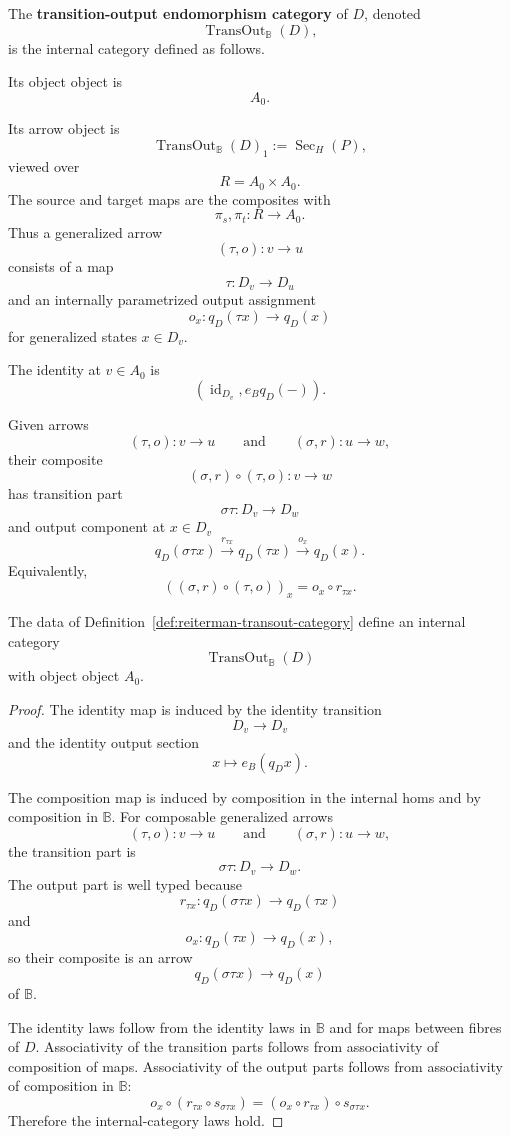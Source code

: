 \begin{definition}
\label{def:reiterman-transout-category}
The \textbf{transition-output endomorphism category} of \(D\), denoted
\[
\operatorname{TransOut}_{\mathbb B}(D),
\]
is the internal category defined as follows.

Its object object is
\[
A_0.
\]

Its arrow object is
\[
\operatorname{TransOut}_{\mathbb B}(D)_1
:=
\operatorname{Sec}_H(P),
\]
viewed over
\[
R=A_0\times A_0.
\]
The source and target maps are the composites with
\[
\pi_s,\pi_t:R\to A_0.
\]
Thus a generalized arrow
\[
(\tau,o):v\to u
\]
consists of a map
\[
\tau:D_v\to D_u
\]
and an internally parametrized output assignment
\[
o_x:q_D(\tau x)\to q_D(x)
\]
for generalized states \(x\in D_v\).

The identity at \(v\in A_0\) is
\[
(\operatorname{id}_{D_v}, e_Bq_D(-)).
\]

Given arrows
\[
(\tau,o):v\to u
\qquad\text{and}\qquad
(\sigma,r):u\to w,
\]
their composite
\[
(\sigma,r)\circ(\tau,o):v\to w
\]
has transition part
\[
\sigma\tau:D_v\to D_w
\]
and output component at \(x\in D_v\)
\[
q_D(\sigma\tau x)
\xrightarrow{r_{\tau x}}
q_D(\tau x)
\xrightarrow{o_x}
q_D(x).
\]
Equivalently,
\[
((\sigma,r)\circ(\tau,o))_x
=
o_x\circ r_{\tau x}.
\]
\end{definition}

\begin{proposition}
\label{prop:reiterman-transout-is-internal-category}
The data of Definition~\ref{def:reiterman-transout-category} define an
internal category
\[
\operatorname{TransOut}_{\mathbb B}(D)
\]
with object object \(A_0\).
\end{proposition}

\begin{proof}
The identity map is induced by the identity transition
\[
D_v\to D_v
\]
and the identity output section
\[
x\longmapsto e_B(q_Dx).
\]

The composition map is induced by composition in the internal homs and by
composition in \(\mathbb B\). For composable generalized arrows
\[
(\tau,o):v\to u
\qquad\text{and}\qquad
(\sigma,r):u\to w,
\]
the transition part is
\[
\sigma\tau:D_v\to D_w.
\]
The output part is well typed because
\[
r_{\tau x}:q_D(\sigma\tau x)\to q_D(\tau x)
\]
and
\[
o_x:q_D(\tau x)\to q_D(x),
\]
so their composite is an arrow
\[
q_D(\sigma\tau x)\to q_D(x)
\]
of \(\mathbb B\).

The identity laws follow from the identity laws in \(\mathbb B\) and for maps
between fibres of \(D\). Associativity of the transition parts follows from
associativity of composition of maps. Associativity of the output parts
follows from associativity of composition in \(\mathbb B\):
\[
o_x\circ(r_{\tau x}\circ s_{\sigma\tau x})
=
(o_x\circ r_{\tau x})\circ s_{\sigma\tau x}.
\]
Therefore the internal-category laws hold.
\end{proof}

